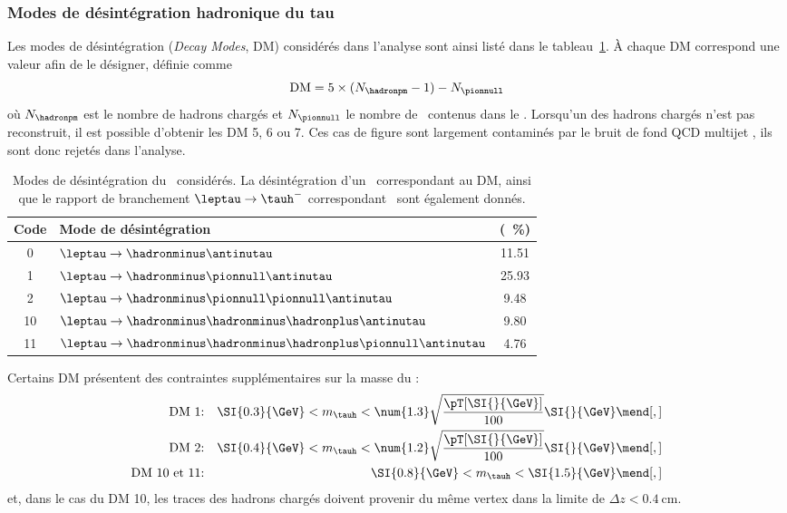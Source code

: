 \subsubsection{Modes de désintégration hadronique du tau}
Les modes de désintégration (\emph{Decay Modes}, DM) considérés dans l'analyse sont ainsi listé dans le tableau~\ref{tab-tauh-DMs}.
À chaque DM correspond une valeur afin de le désigner, définie comme
\begin{equation}
\text{DM} = 5\times(N_{\hadronpm}-1) - N_{\pionnull}
\end{equation}
où $N_{\hadronpm}$ est le nombre de hadrons chargés et $N_{\pionnull}$ le nombre de \pionnull\ contenus dans le \tauh.
Lorsqu'un des hadrons chargés n'est pas reconstruit, il est possible d'obtenir les DM 5, 6 ou 7.
Ces cas de figure sont largement contaminés par le bruit de fond \og QCD multijet \fg, ils sont donc rejetés dans l'analyse.
\begin{table}[h]
\centering
\begin{tabular}{clc}
\toprule
Code & Mode de désintégration & \BR{} (\SI{}{\%})\\
\midrule
0 & $\leptau\to \hadronminus \antinutau$ & \num{11.51} \\
1 & $\leptau\to \hadronminus \pionnull \antinutau$ & \num{25.93} \\
2 & $\leptau\to \hadronminus \pionnull\pionnull \antinutau$ & \num{9.48} \\
10 & $\leptau\to \hadronminus \hadronminus\hadronplus \antinutau$ & \num{9.80} \\
11 & $\leptau\to \hadronminus \hadronminus\hadronplus\pionnull\antinutau$ & \num{4.76} \\
\bottomrule
\end{tabular}
\caption[Modes de désintégration du \tau\ considérés.]{Modes de désintégration du \tau\ considérés. La désintégration d'un \leptau\ correspondant au DM, ainsi que le rapport de branchement $\leptau\to\tauh^-$ correspondant~\cite{PDG_booklet_2020} sont également donnés.}
\label{tab-tauh-DMs}
\end{table}
\par
Certains DM présentent des contraintes supplémentaires sur la masse du \tauh:
\begin{align*}
\text{DM 1:} && \SI{0.3}{\GeV} < m_{\tauh} < \num{1.3}\sqrt{\frac{\pT[\SI{}{\GeV}]}{100}} \SI{}{\GeV}\mend[,]\\
\text{DM 2:} && \SI{0.4}{\GeV} < m_{\tauh} < \num{1.2}\sqrt{\frac{\pT[\SI{}{\GeV}]}{100}} \SI{}{\GeV}\mend[,]\\
\text{DM 10 et 11:} && \SI{0.8}{\GeV} < m_{\tauh} < \SI{1.5}{\GeV}\mend[,]\\
\end{align*}
et, dans le cas du DM 10, les traces des hadrons chargés doivent provenir du même vertex dans la limite de $\Delta z < \SI{0.4}{\centi\meter}$.
